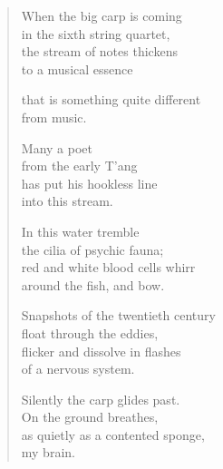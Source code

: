 {\setlength{\stanzaskip}{0.5em}


\vspace*{-\onelineskip}
\begin{verse}

When the big carp is coming\\
in the sixth string quartet,\\
the stream of notes thickens\\
to a musical essence

that is something quite different\\
from music.

Many a poet\\
from the early T'ang\\
has put his hookless line\\
into this stream.

In this water tremble\\
the cilia of psychic fauna;\\
red and white blood cells whirr\\
around the fish, and bow.

Snapshots of the twentieth century\\
float through the eddies,\\
flicker and dissolve in flashes\\
of a nervous system.

Silently the carp glides past.\\
On the ground breathes,\\
as quietly as a contented sponge,\\
my brain.

\end{verse}

}

